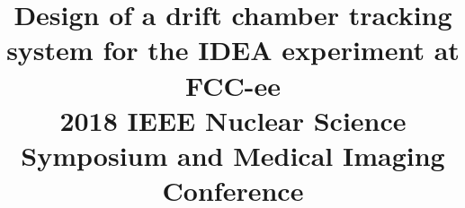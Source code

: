 \documentclass[conference]{IEEEtran}
\begin{document}
%
\title{Design of a drift chamber tracking system for the IDEA experiment at FCC-ee\\ \vspace{0.5cm}
\Large{2018 IEEE Nuclear Science Symposium and Medical Imaging Conference}
}


\author{
}


%
\end{document}
